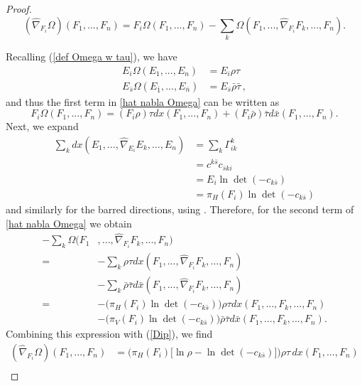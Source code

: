 \documentclass[12pt,letterpaper]{amsart}%
\numberwithin{mycounter}{section}
\theoremstyle{plain}
\numberwithin{equation}{section}
\theoremstyle{definition}
\begin{document}
\begin{proof}
\begin{equation}\label{hat nabla Omega}
    (\hat{\nabla}_{F_{i}}\Omega)(F_{1},...,F_{n})=F_{i}\Omega(F_{1},...,F_{n})-\sum_{k}\Omega(F_{1},...,\hat{\nabla}_{F_{i}}F_{k},...,F_{n}).
\end{equation}

Recalling (\ref{def Omega w tau}), we have
\begin{align*}
E_{i}\Omega(E_{1},...,E_{n})  &  =E_{i}\rho\tau\\
E_{\bar{s}}\Omega(E_{\bar{1}},...,E_{\bar{n}})  &  =E_{\bar{s}}\bar{\rho}\bar{\tau} \,
,
\end{align*}
and thus the first term in \eqref{hat nabla Omega} can be written as
\begin{equation}\label{Dip}
F_{i}\Omega(F_{1},...,F_{n})=\left(  F_{i}\rho\right) \tau dx(F_{1}%
,...,F_{n})+\left(  F_i\bar{\rho}\right)\bar{\tau} d\bar{x}(F_{1}%
,...,F_{n}). 
\end{equation}
Next, we expand
\begin{align*}
\sum_{k} dx(E_{1},\ldots,\hat{\nabla}_{E_{i}}E_{k},\ldots,E_{n})
    &= \sum_{k} \Gamma_{ik}^{k} \\
    &= c^{k\bar{s}} c_{\bar{s} k i} \\
    &= E_{i}\ln\det(-c_{k\bar{s}}) \\
    &= \pi_H(F_{i})\ln\det(-c_{k\bar{s}})
\end{align*}
and similarly for the barred directions, using \cite[Lemma 4.1, stated as Lemma \ref{KM41} below]{KM}. Therefore, for the second term of \eqref{hat nabla Omega} we obtain
\begin{align*}
-\sum_{k}\Omega(F_{1}&,...,\hat{\nabla}_{F_{i}}F_{k},...,F_{n})\\
 =&-\sum_{k}\rho\tau dx(F_{1},...,\hat{\nabla}_{F_{i}}F_{k},...,F_{n})\\
& -\sum_{k}\bar{\rho}\bar{\tau}d\bar{x}(F_{1},...,\hat{\nabla}_{F_{i}}%
F_{k},...,F_{n})\\
=&-\Big(\pi_H(F_{i}) \ln\det(-c_{k\bar{s}})\Big)\rho\tau dx(F_{1},...,F_{k},...,F_{n})\\
&  -\Big(\pi_V(F_{i})\ln
\det(-c_{k\bar{s}})\Big)\bar{\rho}\bar{\tau}d\bar{x}(F_{1},...,F_{k},...,F_{n}) .
\end{align*}
Combining this expression with (\ref{Dip}), we find 
\begin{align*}
(\hat{\nabla}_{F_{i}}\Omega)(F_{1},...,F_{n})  &  =\Big(\pi_H(F_{i})\big[  \ln\rho
-\ln\det(-c_{k\bar{s}})\big]\Big)\rho\tau\,   dx(F_{1},...,F_{n})\\

\end{align*}
\end{proof}
\end{document}
